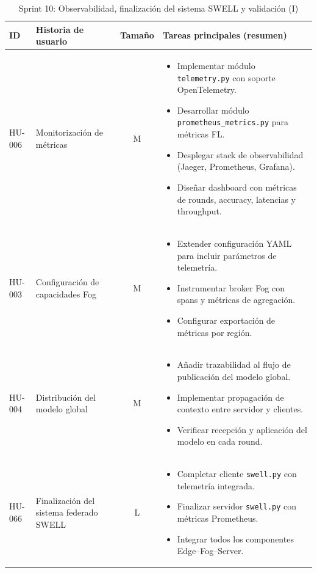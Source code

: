 \documentclass{report}
\begin{document}
\begin{table}[H]
\centering
\footnotesize
\caption{Sprint 10: Observabilidad, finalización del sistema SWELL y validación (I)}
\label{tab:sprint10a}
\renewcommand{\arraystretch}{1.2}
\setlength{\tabcolsep}{4pt}
\begin{tabular}{|l|p{4.8cm}|c|p{5.6cm}|}
\hline
\textbf{ID} & \textbf{Historia de usuario} & \textbf{Tamaño} & \textbf{Tareas principales (resumen)} \\ \hline

HU-006 &
Monitorización de métricas &
M &
\begin{itemize}\setlength\itemsep{0.15em}
  \item Implementar módulo \texttt{telemetry.py} con soporte OpenTelemetry.
  \item Desarrollar módulo \texttt{prometheus\_metrics.py} para métricas FL.
  \item Desplegar stack de observabilidad (Jaeger, Prometheus, Grafana).
  \item Diseñar dashboard con métricas de rounds, accuracy, latencias y throughput.
\end{itemize}
\\ \hline

HU-003 &
Configuración de capacidades Fog &
M &
\begin{itemize}\setlength\itemsep{0.15em}
  \item Extender configuración YAML para incluir parámetros de telemetría.
  \item Instrumentar broker Fog con spans y métricas de agregación.
  \item Configurar exportación de métricas por región.
\end{itemize}
\\ \hline

HU-004 &
Distribución del modelo global &
M &
\begin{itemize}\setlength\itemsep{0.15em}
  \item Añadir trazabilidad al flujo de publicación del modelo global.
  \item Implementar propagación de contexto entre servidor y clientes.
  \item Verificar recepción y aplicación del modelo en cada round.
\end{itemize}
\\ \hline

HU-066 &
Finalización del sistema federado SWELL &
L &
\begin{itemize}\setlength\itemsep{0.15em}
  \item Completar cliente \texttt{swell.py} con telemetría integrada.
  \item Finalizar servidor \texttt{swell.py} con métricas Prometheus.
  \item Integrar todos los componentes Edge--Fog--Server.
\end{itemize}
\\ \hline


\end{tabular}
\end{table}
\end{document}
